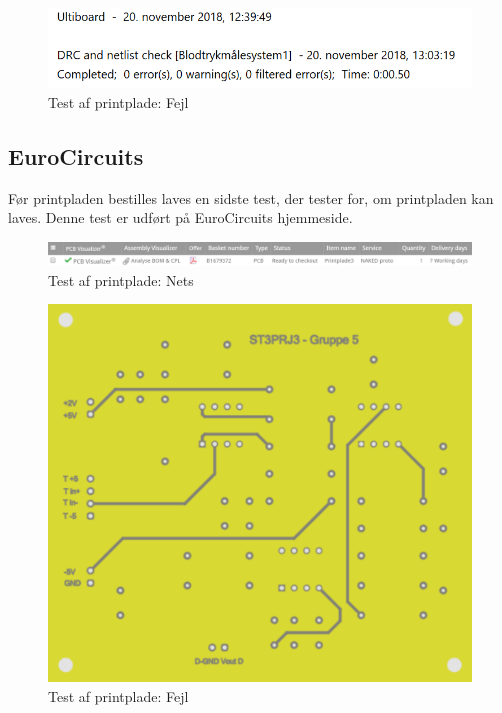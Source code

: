 \begin{figure}[h!]
	\centering
	\includegraphics[width=0.6\linewidth]{Hardware/Fejl}
	\caption{Test af printplade: Fejl}
	\label{fig:Fejl}
\end{figure}

\subsection{EuroCircuits}
Før printpladen bestilles laves en sidste test, der tester for, om printpladen kan laves. Denne test er udført på EuroCircuits hjemmeside.

\begin{figure}[h!]
	\centering
	\includegraphics[width=0.8\linewidth]{Hardware/EuroCircuits1}
	\caption{Test af printplade: Nets}
	\label{fig:EuroCircuits1}
\end{figure}

\begin{figure}[h!]
	\centering
	\includegraphics[width=0.5\linewidth]{Hardware/EuroCircuits2}
	\caption{Test af printplade: Fejl}
	\label{fig:EuroCircuits2}
\end{figure}
 
